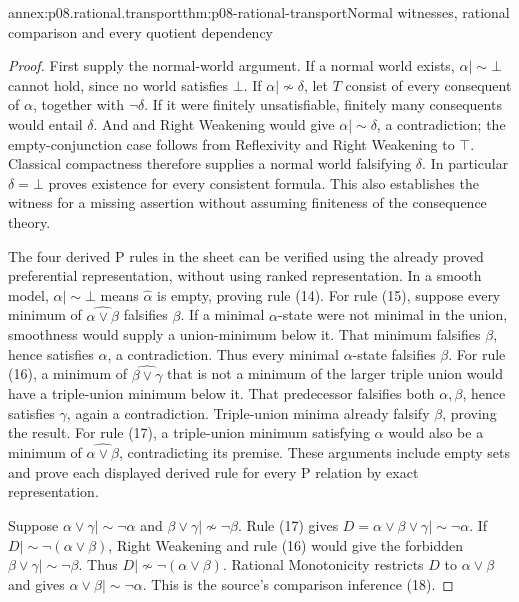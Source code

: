 \begin{annexitem}{annex:p08.rational.transport}{thm:p08-rational-transport}{Normal witnesses, rational comparison and every quotient dependency}
\begin{proof}
First supply the normal-world argument. If a normal world exists,
\(\alpha\mathrel{|\!\sim}\bot\) cannot hold, since no world
satisfies \(\bot\). If \(\alpha\mathrel{|\!\not\sim}\delta\),
let \(T\) consist of every consequent of \(\alpha\), together
with \(\neg\delta\). If it were finitely unsatisfiable, finitely
many consequents would entail \(\delta\). And and Right Weakening
would give \(\alpha\mathrel{|\!\sim}\delta\), a contradiction;
the empty-conjunction case follows from Reflexivity and Right Weakening
to \(\top\). Classical compactness therefore supplies a normal
world falsifying \(\delta\). In particular \(\delta=\bot\)
proves existence for every consistent formula. This also establishes
the witness for a missing assertion without assuming finiteness of
the consequence theory.

The four derived P rules in the sheet can be verified using the already
proved preferential representation, without using ranked representation.
In a smooth model, \(\alpha\mathrel{|\!\sim}\bot\) means
\(\widehat\alpha\) is empty, proving rule (14). For rule (15),
suppose every minimum of \(\widehat{\alpha\vee\beta}\)
falsifies \(\beta\). If a minimal \(\alpha\)-state were not
minimal in the union, smoothness would supply a union-minimum below
it. That minimum falsifies \(\beta\), hence satisfies \(\alpha\),
a contradiction. Thus every minimal \(\alpha\)-state falsifies
\(\beta\). For rule (16), a minimum of
\(\widehat{\beta\vee\gamma}\) that is not a minimum of the
larger triple union would have a triple-union minimum below it.
That predecessor falsifies both \(\alpha,\beta\), hence satisfies
\(\gamma\), again a contradiction. Triple-union minima already
falsify \(\beta\), proving the result. For rule (17), a
triple-union minimum satisfying \(\alpha\) would also be a
minimum of \(\widehat{\alpha\vee\beta}\), contradicting its
premise. These arguments include empty sets and prove each displayed
derived rule for every P relation by exact representation.

Suppose \(\alpha\vee\gamma\mathrel{|\!\sim}\neg\alpha\)
and \(\beta\vee\gamma\mathrel{|\!\not\sim}\neg\beta\).
Rule (17) gives \(D=\alpha\vee\beta\vee\gamma\mathrel{|\!\sim}\neg\alpha\).
If \(D\mathrel{|\!\sim}\neg(\alpha\vee\beta)\), Right
Weakening and rule (16) would give the forbidden
\(\beta\vee\gamma\mathrel{|\!\sim}\neg\beta\).
Thus \(D\mathrel{|\!\not\sim}\neg(\alpha\vee\beta)\).
Rational Monotonicity restricts \(D\) to \(\alpha\vee\beta\)
and gives \(\alpha\vee\beta\mathrel{|\!\sim}\neg\alpha\).
This is the source's comparison inference (18).


\end{proof}
\end{annexitem}
